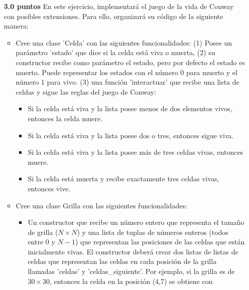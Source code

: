 \documentclass{article}
\begin{document}
\begin{itemize}
\begin{itemize}
    \end{itemize} %
    
    \item[\textbf{3.0 puntos}] En este ejercicio, implementará el juego de la vida de Conway con posibles extensiones. Para ello, organizará su código de la siguiente manera:
        \begin{itemize}
            \item Cree una clase 'Celda' con las siguientes funcionalidades: (1) Posee un parámetro 'estado' que dice si la celda está viva o muerta, (2) su constructor recibe como parámetro el estado, pero por defecto el estado es muerto. Puede representar los estados con el número 0 para muerto y el número 1 para vivo. (3) una función 'interactuar' que recibe una lista de celdas y sigue las reglas del juego de Conway: 
                \begin{itemize}
                    \item Si la celda está viva y la lista posee menos de dos elementos vivos, entonces la celda muere.
                    \item Si la celda está viva y la lista posee dos o tres, entonces sigue viva.
                    \item Si la celda está viva y la lista posee más de tres celdas vivas, entonces muere.
                    \item Si la celda está muerta y recibe exactamente tres celdas vivas, entonces vive.
                \end{itemize}

            \item Cree una clase Grilla con las siguientes funcionalidades: 
                \begin{itemize}
                    \item Un constructor que recibe un número entero que representa el tamaño de grilla ($N\times N$) y una lista de tuplas de números enteros (todos entre 0 y $N-1$) que representan las posiciones de las celdas que están inicialmente vivas. El constructor deberá crear dos listas de listas de celdas que representan las celdas en cada posición de la grilla llamadas 'celdas' y 'celdas\_siguiente'. Por ejemplo, si la grilla es de $30\times 30$, entonces la celda en la posición (4,7) se obtiene con 


\end{itemize}
\end{itemize}
\end{itemize}
\end{document}
